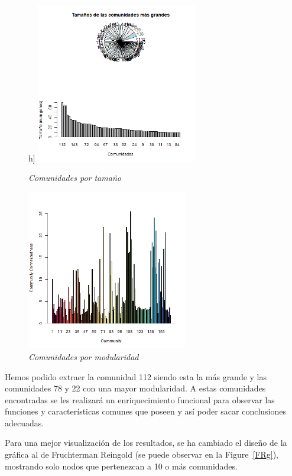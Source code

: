 \begin{figure}h]
	\centering
	\includegraphics[width=70mm,scale=1.2]{figures/lc_larger_clusters.png}
	\caption{\textit{Comunidades por tamaño}}
	\label{comTamaño}
\end{figure}

\begin{figure}[h]
	\centering
	\includegraphics[width=70mm,scale=1.2]{figures/clusters_modularity.png}
	\caption{\textit{Comunidades por modularidad}}
	\label{comModularidad}
\end{figure}

Hemos podido extraer la comunidad 112 siendo esta la más grande y las comunidades 78 y 22 con una mayor modularidad. A estas comunidades encontradas se les realizará un enriquecimiento funcional para observar las funciones y características comunes que poseen y así poder sacar conclusiones adecuadas.

Para una mejor visualización de los resultados, se ha cambiado el diseño de la gráfica al de Fruchterman Reingold (se puede observar en la Figure~\ref{FRg}), mostrando solo nodos que pertenezcan a 10 o más comunidades.

